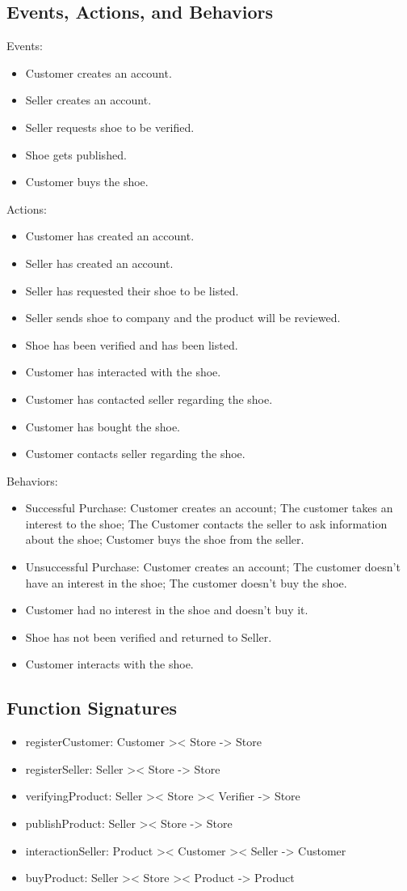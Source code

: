 \subsection{Events, Actions, and Behaviors}
Events:
\begin{itemize}
  \item Customer creates an account.
  \item Seller creates an account.
  \item Seller requests shoe to be verified.
  \item Shoe gets published.
  \item Customer buys the shoe.
\end{itemize}
Actions:
\begin{itemize}
  \item Customer has created an account.
  \item Seller has created an account.
  \item Seller has requested their shoe to be listed.
  \item Seller sends shoe to company and the product will be reviewed.
  \item Shoe has been verified and has been listed.
  \item Customer has interacted with the shoe.
  \item Customer has contacted seller regarding the shoe.
  \item Customer has bought the shoe.
  \item Customer contacts seller regarding the shoe.
\end{itemize}
Behaviors:
\begin{itemize}
  \item Successful Purchase: Customer creates an account; The customer takes an interest to the shoe; The Customer contacts the seller to ask information about the shoe; Customer buys the shoe from the seller.
  \item Unsuccessful Purchase: Customer creates an account; The customer doesn't have an interest in the shoe; The customer doesn't buy the shoe.
  \item Customer had no interest in the shoe and doesn't buy it.
  \item Shoe has not been verified and returned to Seller.
  \item Customer interacts with the shoe.
\end{itemize}
\subsection{Function Signatures}
\begin{itemize}
  \item registerCustomer: Customer >< Store -> Store
  \item registerSeller: Seller >< Store -> Store
  \item verifyingProduct: Seller >< Store >< Verifier -> Store
  \item publishProduct: Seller >< Store -> Store
  \item interactionSeller: Product >< Customer >< Seller -> Customer
  \item buyProduct: Seller >< Store >< Product -> Product
\end{itemize}
\newpage
